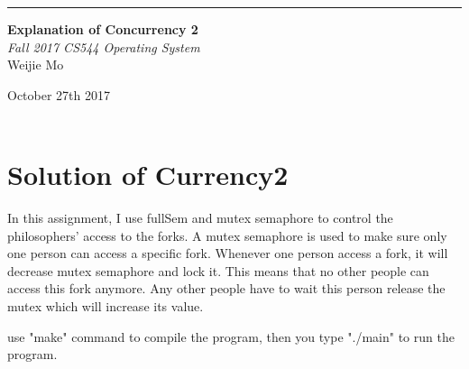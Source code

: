 \documentclass[10pt,draftclsnofoot,peerreview,letterpaper,onecolumn,]{IEEEtran}
\begin{document}
\begin{titlepage} %
	
	\raggedleft %
	
	\rule{1pt}{\textheight} %
	\hspace{0.05\textwidth} %
	\parbox[b]{0.75\textwidth}{ %
		
		{\Huge\bfseries Explanation of Concurrency 2   }\\[2\baselineskip] %
		{\large\textit{Fall 2017 CS544 Operating System}}\\[4\baselineskip] %
		{\Large Weijie Mo} %
		
		\vspace{0.5\textheight} %
		
		{\noindent October 27th 2017}\\[\baselineskip] %
        {\noindent }\\[\baselineskip] %
	}

\end{titlepage}


\section{Solution of Currency2}

In this assignment, I use fullSem and mutex semaphore to control the philosophers' access to the forks. A mutex semaphore is used to make sure only one person can access a specific fork. Whenever one person access a fork, it will decrease mutex semaphore and lock it. This means that no other people can access this fork anymore. Any other people have to wait this person release the mutex which will increase its value.

use "make" command to compile the program, then you type "./main" to run the program.
\end{document}
